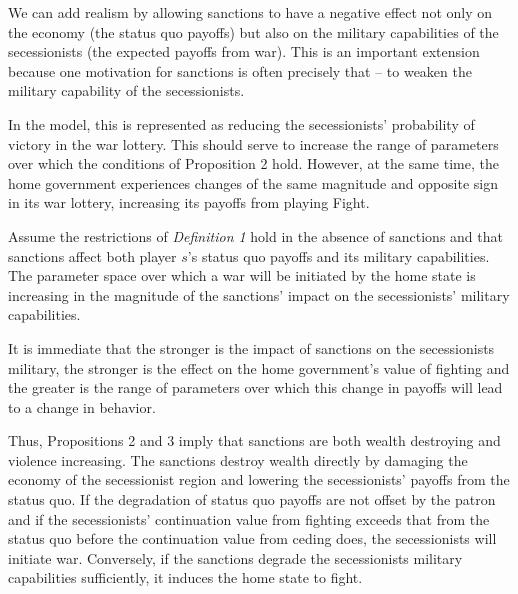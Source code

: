 We can add realism by allowing sanctions to have a negative effect not only on the economy (the status quo payoffs) but also on the military capabilities of the secessionists (the expected payoffs from war). This is an important extension because one motivation for sanctions is often precisely that -- to weaken the military capability of the secessionists. 

In the model, this is represented as reducing the secessionists' probability of victory in the war lottery. This should serve to increase the range of parameters over which the conditions of Proposition 2 hold. However, at the same time, the home government experiences changes of the same magnitude and opposite sign in its war lottery, increasing its payoffs from playing Fight. 

\begin{proposition}
Assume the restrictions of \emph{Definition 1} hold in the absence of sanctions and that sanctions affect both player $s$'s status quo payoffs and its military capabilities. The parameter space over which a war will be initiated by the home state is increasing in the magnitude of the sanctions' impact on the secessionists' military capabilities.
\end{proposition}

It is immediate that the stronger is the impact of sanctions on the secessionists military, the stronger is the effect on the home government's value of fighting and the greater is the range of parameters over which this change in payoffs will lead to a change in behavior.

Thus, Propositions 2 and 3 imply that sanctions are both wealth destroying and violence increasing. The sanctions destroy wealth directly by damaging the economy of the secessionist region and lowering the secessionists' payoffs from the status quo. If the degradation of status quo payoffs are not offset by the patron and if the secessionists' continuation value from fighting exceeds that from the status quo before the continuation value from ceding does, the secessionists will initiate war. Conversely, if the sanctions degrade the secessionists military capabilities sufficiently, it induces the home state to fight.



